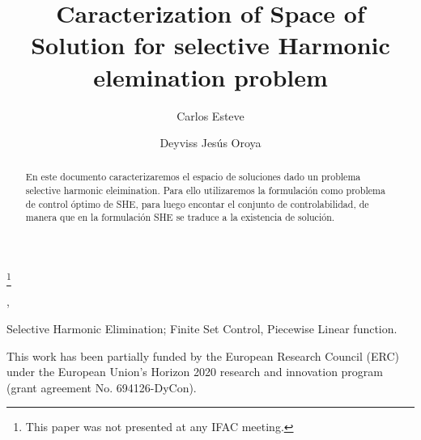 \documentclass[twocolumn]{autart}    %
\begin{document}
\begin{frontmatter}

\title{Caracterization of Space of Solution for selective Harmonic elemination problem} %

\thanks[footnoteinfo]{This paper was not presented at any IFAC 
meeting.}

\author[UAM,FD]{Carlos Esteve},               %
\author[UD]{Deyviss Jes\'us Oroya}  %
\address[FD]{Chair of Computational Mathematics, Fundaci\'on Deusto, Avenida de las Universidades 24, 48007 Bilbao, Basque Country, Spain.}  %
\address[UD]{Universidad de Deusto, Avenida de las Universidades 24, 48007 Bilbao, Basque Country, Spain.}  %
\address[UAM]{Departamento de Matem\'aticas, Universidad Aut\'onoma de Madrid, 28049 Madrid, Spain.}  %
          
\begin{keyword}                           %
Selective Harmonic Elimination; Finite Set Control, Piecewise Linear function.               %
\end{keyword}                             %


\begin{abstract}                          %
En este documento caracterizaremos el espacio de soluciones dado un problema selective harmonic eleimination. Para ello utilizaremos la formulación como problema de control óptimo de SHE, para luego encontar el conjunto de controlabilidad, de manera que en la formulación SHE se traduce a la existencia de solución.
\end{abstract}

\end{frontmatter} 








\appendix

\begin{ack}                               %
This work has been partially funded by the European Research Council (ERC) under the European Union’s Horizon 2020 research and innovation program
(grant agreement No. 694126-DyCon).
\end{ack}
 
\end{document}
